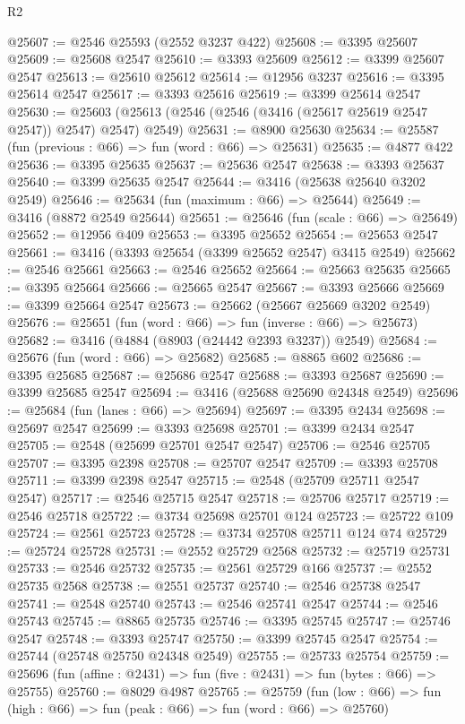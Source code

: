 \begin{lexlean}{R2}
\begin{coremodule}
@25607 := @2546 @25593 (@2552 @3237 @422)
@25608 := @3395 @25607
@25609 := @25608 @2547
@25610 := @3393 @25609
@25612 := @3399 @25607 @2547
@25613 := @25610 @25612
@25614 := @12956 @3237
@25616 := @3395 @25614 @2547
@25617 := @3393 @25616
@25619 := @3399 @25614 @2547
@25630 := @25603 (@25613 (@2546 (@2546 (@3416 (@25617 @25619 @2547 @2547)) @2547) @2547) @2549)
@25631 := @8900 @25630
@25634 := @25587 (fun (previous : @66) => fun (word : @66) => @25631)
@25635 := @4877 @422
@25636 := @3395 @25635
@25637 := @25636 @2547
@25638 := @3393 @25637
@25640 := @3399 @25635 @2547
@25644 := @3416 (@25638 @25640 @3202 @2549)
@25646 := @25634 (fun (maximum : @66) => @25644)
@25649 := @3416 (@8872 @2549 @25644)
@25651 := @25646 (fun (scale : @66) => @25649)
@25652 := @12956 @409
@25653 := @3395 @25652
@25654 := @25653 @2547
@25661 := @3416 (@3393 @25654 (@3399 @25652 @2547) @3415 @2549)
@25662 := @2546 @25661
@25663 := @2546 @25652
@25664 := @25663 @25635
@25665 := @3395 @25664
@25666 := @25665 @2547
@25667 := @3393 @25666
@25669 := @3399 @25664 @2547
@25673 := @25662 (@25667 @25669 @3202 @2549)
@25676 := @25651 (fun (word : @66) => fun (inverse : @66) => @25673)
@25682 := @3416 (@4884 (@8903 (@24442 @2393 @3237)) @2549)
@25684 := @25676 (fun (word : @66) => @25682)
@25685 := @8865 @602
@25686 := @3395 @25685
@25687 := @25686 @2547
@25688 := @3393 @25687
@25690 := @3399 @25685 @2547
@25694 := @3416 (@25688 @25690 @24348 @2549)
@25696 := @25684 (fun (lanes : @66) => @25694)
@25697 := @3395 @2434
@25698 := @25697 @2547
@25699 := @3393 @25698
@25701 := @3399 @2434 @2547
@25705 := @2548 (@25699 @25701 @2547 @2547)
@25706 := @2546 @25705
@25707 := @3395 @2398
@25708 := @25707 @2547
@25709 := @3393 @25708
@25711 := @3399 @2398 @2547
@25715 := @2548 (@25709 @25711 @2547 @2547)
@25717 := @2546 @25715 @2547
@25718 := @25706 @25717
@25719 := @2546 @25718
@25722 := @3734 @25698 @25701 @124
@25723 := @25722 @109
@25724 := @2561 @25723
@25728 := @3734 @25708 @25711 @124 @74
@25729 := @25724 @25728
@25731 := @2552 @25729 @2568
@25732 := @25719 @25731
@25733 := @2546 @25732
@25735 := @2561 @25729 @166
@25737 := @2552 @25735 @2568
@25738 := @2551 @25737
@25740 := @2546 @25738 @2547
@25741 := @2548 @25740
@25743 := @2546 @25741 @2547
@25744 := @2546 @25743
@25745 := @8865 @25735
@25746 := @3395 @25745
@25747 := @25746 @2547
@25748 := @3393 @25747
@25750 := @3399 @25745 @2547
@25754 := @25744 (@25748 @25750 @24348 @2549)
@25755 := @25733 @25754
@25759 := @25696 (fun (affine : @2431) => fun (five : @2431) => fun (bytes : @66) => @25755)
@25760 := @8029 @4987
@25765 := @25759
    (fun (low : @66) => fun (high : @66) => fun (peak : @66) => fun (word : @66) => @25760)

\end{coremodule}
\end{lexlean}
